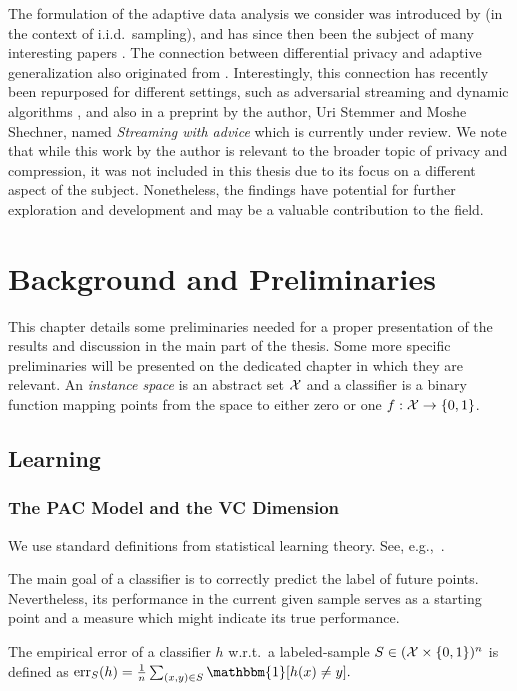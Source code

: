 \documentclass[12pt,a4paper,oneside,onecolumn]{book}
\begin{document}
The formulation of the adaptive data analysis we consider was introduced by \citet{dwork2015reusable} (in the context of i.i.d.\ sampling), and has since then been the subject of many interesting papers \citep{bassily2016algorithmic,bun2018fingerprinting,hardt2014preventing,NIPS2018_7876,ShenfeldL19,JungLN0SS20,abs-2106-10761}. The connection between differential privacy and adaptive generalization also originated from \citet{dwork2015reusable}. Interestingly, this connection has recently been repurposed for different settings, such as adversarial streaming and dynamic algorithms \citep{HassidimKMMS20,abs-2107-14527,KaplanMNS21,abs-2111-03980}, and also in a preprint by the author, Uri Stemmer and Moshe Shechner, named \emph{Streaming with advice} which is currently under review.
We note that while this work by the author is relevant to the broader topic of privacy and compression, it was not included in this thesis due to its focus on a different aspect of the subject. Nonetheless, the findings have potential for further exploration and development and may be a valuable contribution to the field.


\chapter{Background and Preliminaries}
\label{sec:background}
This chapter details some preliminaries needed for a proper presentation of the results and discussion in the main part of the thesis. Some more specific preliminaries will be presented on the dedicated chapter in which they are relevant.
An {\em instance space} is an abstract set $\mathcal{X}$ 
and a classifier is a binary function mapping points from the space to either zero or one $f: \mathcal{X} \to \{0,1\}$.

\section{Learning}

\subsection{The PAC Model and the VC Dimension}
We use standard definitions from statistical learning theory. 
See, e.g.,\ \cite{shalev-shwartz_understanding_2014}.

The main goal of a classifier is to correctly predict the label of future points. 
Nevertheless, its performance in the current given sample serves as a starting point and a measure which might indicate its true performance.
\begin{definition}
The empirical error of a classifier $h$ 
w.r.t.\ a labeled-sample $S \in (\mathcal{X}\times\{0,1\})^n$ is defined as  
$
\errS{h}{S} = \frac{1}{n}\sum_{(x,y)\in S} \mathbbm{1}[h(x) \neq y].
$
\end{definition}
\end{document}
